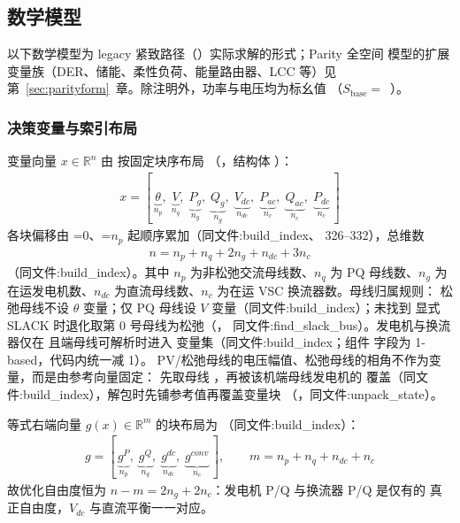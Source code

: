 \subsection{数学模型}\label{subsec:acopfnative:model}

以下数学模型为 legacy 紧致路径（）实际求解的形式；Parity 全空间
模型的扩展变量族（DER、储能、柔性负荷、能量路由器、LCC 等）见
第~\ref{sec:parityform}~章。除注明外，功率与电压均为标幺值
（$S_{\mathrm{base}}=$~）。

\subsubsection*{决策变量与索引布局}
变量向量 $x\in\mathbb{R}^{n}$ 由  按固定块序布局
（，结构体
）：
\begin{align*}
x = \left[\,
\underbrace{\theta}_{n_p},\;
\underbrace{V}_{n_q},\;
\underbrace{P_g}_{n_g},\;
\underbrace{Q_g}_{n_g},\;
\underbrace{V_{dc}}_{n_{dc}},\;
\underbrace{P_{ac}}_{n_c},\;
\underbrace{Q_{ac}}_{n_c},\;
\underbrace{P_{dc}}_{n_c}
\,\right]
\end{align*}
各块偏移由 =0、=$n_p$ 起顺序累加（同文件:build\_index、
326--332），总维数
\begin{align*}
n = n_p + n_q + 2n_g + n_{dc} + 3n_c
\end{align*}
（同文件:build\_index）。其中 $n_p$ 为非松弛交流母线数、$n_q$ 为 PQ 母线数、$n_g$ 为
在运发电机数、$n_{dc}$ 为直流母线数、$n_c$ 为在运 VSC 换流器数。母线归属规则：
松弛母线不设 $\theta$ 变量；仅 PQ 母线设 $V$ 变量（同文件:build\_index）；未找到
显式 SLACK 时退化取第 0 号母线为松弛（，
同文件:find\_slack\_bus）。发电机与换流器仅在  且端母线可解析时进入
变量集（同文件:build\_index；组件  字段为 1-based，代码内统一减 1）。
PV/松弛母线的电压幅值、松弛母线的相角不作为变量，而是由参考向量固定：
 先取母线 ，再被该机端母线发电机的
 覆盖（同文件:build\_index），解包时先铺参考值再覆盖变量块
（，同文件:unpack\_state）。

等式右端向量 $g(x)\in\mathbb{R}^{m}$ 的块布局为
（同文件:build\_index）：
\begin{align*}
g = \left[\,
\underbrace{g^{P}}_{n_p},\;
\underbrace{g^{Q}}_{n_q},\;
\underbrace{g^{dc}}_{n_{dc}},\;
\underbrace{g^{conv}}_{n_c}
\,\right],\qquad
m = n_p + n_q + n_{dc} + n_c
\end{align*}
故优化自由度恒为 $n-m = 2n_g + 2n_c$：发电机 P/Q 与换流器 P/Q 是仅有的
真正自由度，$V_{dc}$ 与直流平衡一一对应。

